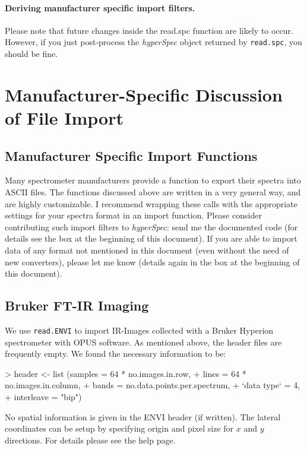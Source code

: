 \documentclass[english, a4paper, 10pt, headings=small, DIV11]{scrartcl}
\renewenvironment{Schunk}{\vspace{0pt}\begin{small}}{\end{small}\vspace{0pt}}
\newcommand{\Rfunction}[2][]{\texorpdfstring{\nohyphens{#1\texttt{#2}}}{#2}}
\newcommand{\Rpackage}[1]{\texorpdfstring{\nohyphens{\textit{#1}}}{#1}}
\newcommand{\Rclass}[1]{\texorpdfstring{\nohyphens{\textit{#1}}}{#1}}
\newcommand{\chy}{\Rclass{hyperSpec}\xspace}
\begin{document}
\paragraph{Deriving manufacturer specific import filters.}
Please note that future changes inside the read.spc function are likely to occur.  However, if you
just post-process the \chy object returned by \Rfunction{read.spc}, you should be fine.

\section{Manufacturer-Specific Discussion of File Import}
\subsection{Manufacturer Specific Import Functions}
\label{sec:manuf-spec-import}
Many spectrometer manufacturers provide a function to export their spectra into ASCII files. The
functions discussed above are written in a very general way, and are highly customizable.  I
recommend wrapping these calls with the appropriate settings for your spectra format in an import
function. Please consider contributing such import filters to \Rpackage{hyperSpec}: send me the
documented code (for details see the box at the beginning of this document).  If you are able to
import data of any format not mentioned in this document (even without the need of new converters),
please let me know (details again in the box at the beginning of this document).

\subsection{Bruker FT-IR Imaging}
\label{sec:read.ENVI.Bruker}

We use \Rfunction{read.ENVI} to import IR-Images collected with a Bruker Hyperion spectrometer with
OPUS software. As mentioned above, the header files are frequently empty. We found the necessary
information to be:
\begin{Schunk}
\begin{Sinput}
> header <- list (samples = 64 * no.images.in.row,
+                 lines = 64 * no.images.in.column,
+                 bands = no.data.points.per.spectrum,
+                 `data type` = 4,
+                 interleave = "bip")
\end{Sinput}
\end{Schunk}
No spatial information is given in the ENVI header (if written). The lateral coordinates can be setup
by specifying origin and pixel size for $x$ and $y$ directions. For details please see the help page.
\end{document}
